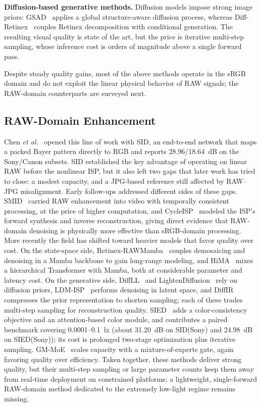 \documentclass[remotesensing,article,accept,moreauthors]{Definitions/mdpi}
\begin{document}
\textbf{Diffusion-based generative methods.} Diffusion models impose strong image priors: GSAD~\citep{hou2023gsad} applies a global structure-aware diffusion process, whereas Diff-Retinex~\citep{yi2023diffretinex} couples Retinex decomposition with conditional generation. The resulting visual quality is state of the art, but the price is iterative multi-step sampling, whose inference cost is orders of magnitude above a single forward pass.

Despite steady quality gains, most of the above methods operate in the sRGB domain and do not exploit the linear physical behavior of RAW signals; the RAW-domain counterparts are surveyed next.

\subsection{RAW-Domain Enhancement}

Chen \emph{et al.}~\citep{chen2018sid} opened this line of work with SID, an end-to-end network that maps a packed Bayer pattern directly to RGB and reports 28.96/18.64~dB on the Sony/Canon subsets. SID established the key advantage of operating on linear RAW before the nonlinear ISP, but it also left two gaps that later work has tried to close: a modest capacity, and a JPG-based reference still affected by RAW--JPG misalignment. Early follow-ups addressed different sides of these gaps. SMID~\citep{chen2019smid} carried RAW enhancement into video with temporally consistent processing, at the price of higher computation, and CycleISP~\citep{zamir2020cycleisp} modeled the ISP's forward synthesis and inverse reconstruction, giving direct evidence that RAW-domain denoising is physically more effective than sRGB-domain processing. More recently the field has shifted toward heavier models that favor quality over cost. On the state-space side, Retinex-RAWMamba~\citep{chen2024rawmamba} couples demosaicing and denoising in a Mamba backbone to gain long-range modeling, and HiMA~\citep{chen2025hima} mixes a hierarchical Transformer with Mamba, both at considerable parameter and latency cost. On the generative side, DiffLL~\citep{jiang2023difll} and LightenDiffusion~\citep{jiang2024lightendiffusion} rely on diffusion priors, LDM-ISP~\citep{wen2023ldmisp} performs denoising in latent space, and DiffIR~\citep{xia2023diffir} compresses the prior representation to shorten sampling; each of these trades multi-step sampling for reconstruction quality. SIED~\citep{jiang2025sied} adds a color-consistency objective and an attention-based color module, and contributes a paired benchmark covering 0.0001--0.1~lx (about 31.20~dB on SID(Sony) and 24.98~dB on SIED(Sony)); its cost is prolonged two-stage optimization plus iterative sampling. GM-MoE~\citep{liao2025gmmoe} scales capacity with a mixture-of-experts gate, again favoring quality over efficiency. Taken together, these methods deliver strong quality, but their multi-step sampling or large parameter counts keep them away from real-time deployment on constrained platforms; a lightweight, single-forward RAW-domain method dedicated to the extremely low-light regime remains missing.
\end{document}
